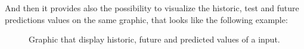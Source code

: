 And then it provides also the possibility to visualize the historic, test and future predictions values on the same graphic, that looks like the following example:

\begin{figure}[H]
	\centering
    \caption{Graphic that display historic, future and predicted values of a input.}
\end{figure}


\newpage




